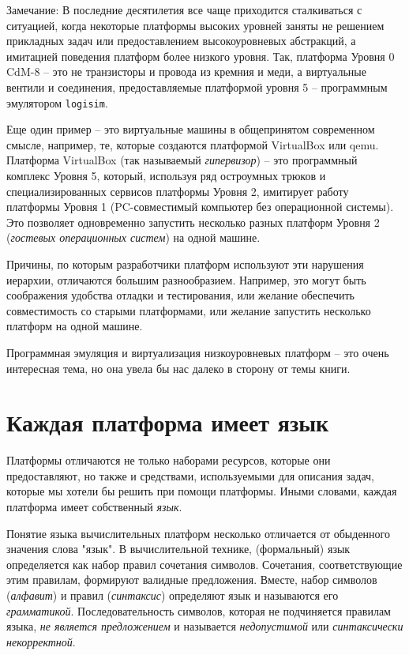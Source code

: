 Замечание: В последние десятилетия все чаще приходится сталкиваться с ситуацией, когда некоторые платформы высоких уровней заняты не решением прикладных задач или предоставлением высокоуровневых абстракций, а имитацией поведения платформ более низкого уровня.  Так, платформа Уровня 0 CdM-8 -- это не транзисторы и провода из кремния и меди, а виртуальные вентили и соединения, предоставляемые платформой уровня 5  -- программным эмулятором {\tt logisim}.  

Еще один пример -- это виртуальные машины в общепринятом современном смысле, например, те, которые создаются платформой VirtualBox или qemu.  Платформа VirtualBox (так называемый \emph{гипервизор}) -- это программный комплекс Уровня 5, который, используя ряд остроумных трюков и специализированных сервисов платформы Уровня 2, имитирует работу платформы Уровня 1 (PC-совместимый компьютер без операционной системы).  Это позволяет одновременно запустить несколько разных платформ Уровня 2 (\emph{гостевых операционных систем}) на одной машине.

Причины, по которым разработчики платформ используют эти нарушения иерархии, отличаются большим разнообразием.  Например, это могут быть соображения удобства отладки и тестирования, или желание обеспечить совместимость со старыми платформами, или желание запустить несколько платформ на одной машине.

Программная эмуляция и виртуализация низкоуровневых платформ -- это очень интересная тема, но она увела бы нас далеко в сторону от темы книги. 

\section{Каждая платформа имеет язык}

Платформы отличаются не только наборами ресурсов, которые они предоставляют, но также и средствами, используемыми для описания задач, которые мы хотели бы решить при помощи платформы.  Иными словами, каждая платформа имеет собственный \emph{язык}.

Понятие языка вычислительных платформ несколько отличается от обыденного значения слова "язык".  В вычислительной технике, (формальный) язык определяется как набор правил сочетания символов.  Сочетания, соответствующие этим правилам, формируют валидные предложения.  Вместе, набор символов (\emph{алфавит}) и правил (\emph{синтаксис}) определяют язык и называются его \emph{грамматикой}.   Последовательность символов, которая не подчиняется правилам языка,  \emph{не является предложением} и называется \emph{недопустимой} или \emph{синтаксически некорректной}.

